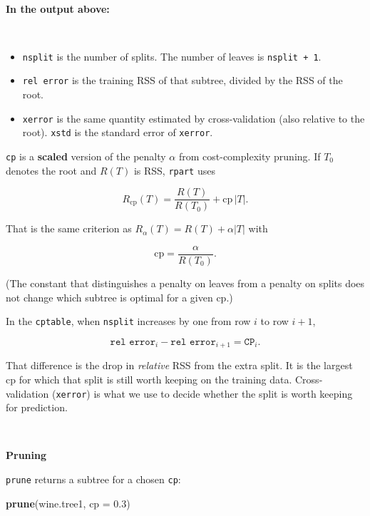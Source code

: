 \documentclass[
]{book}
\newenvironment{Shaded}{\begin{snugshade}}{\end{snugshade}}
\newcommand{\AttributeTok}[1]{\textcolor[rgb]{0.13,0.29,0.53}{#1}}
\newcommand{\FloatTok}[1]{\textcolor[rgb]{0.00,0.00,0.81}{#1}}
\newcommand{\FunctionTok}[1]{\textcolor[rgb]{0.13,0.29,0.53}{\textbf{#1}}}
\newcommand{\NormalTok}[1]{#1}
\begin{document}
~

\textbf{In the output above:}

~

\begin{itemize}
\item
  \texttt{nsplit} is the number of splits. The number of leaves is \texttt{nsplit\ +\ 1}.
\item
  \texttt{rel\ error} is the training RSS of that subtree, divided by the RSS of the root.
\item
  \texttt{xerror} is the same quantity estimated by cross-validation (also relative to the root). \texttt{xstd} is the standard error of \texttt{xerror}.
\end{itemize}

\texttt{cp} is a \textbf{scaled} version of the penalty \(\alpha\) from cost-complexity pruning. If \(T_0\) denotes the root and \(R(T)\) is RSS, \texttt{rpart} uses

\[R_{\mathrm{cp}}(T) = \frac{R(T)}{R(T_0)} + \mathrm{cp}\,|T|. \]

That is the same criterion as \(R_{\alpha}(T)=R(T)+\alpha|T|\) with

\[ \mathrm{cp} = \frac{\alpha}{R(T_0)}. \]

(The constant that distinguishes a penalty on leaves from a penalty on splits does not change which subtree is optimal for a given \(\mathrm{cp}\).)

In the \texttt{cptable}, when \texttt{nsplit} increases by one from row \(i\) to row \(i+1\),

\[\texttt{rel error}_i - \texttt{rel error}_{i+1}=\texttt{CP}_i.\]

That difference is the drop in \emph{relative} RSS from the extra split. It is the largest \(\mathrm{cp}\) for which that split is still worth keeping on the training data. Cross-validation (\texttt{xerror}) is what we use to decide whether the split is worth keeping for prediction.

~

\textbf{Pruning}

\texttt{prune} returns a subtree for a chosen \texttt{cp}:

\begin{Shaded}
\begin{Highlighting}[]
\FunctionTok{prune}\NormalTok{(wine.tree1, }\AttributeTok{cp =} \FloatTok{0.3}\NormalTok{)}
\end{Highlighting}
\end{Shaded}
\end{document}
